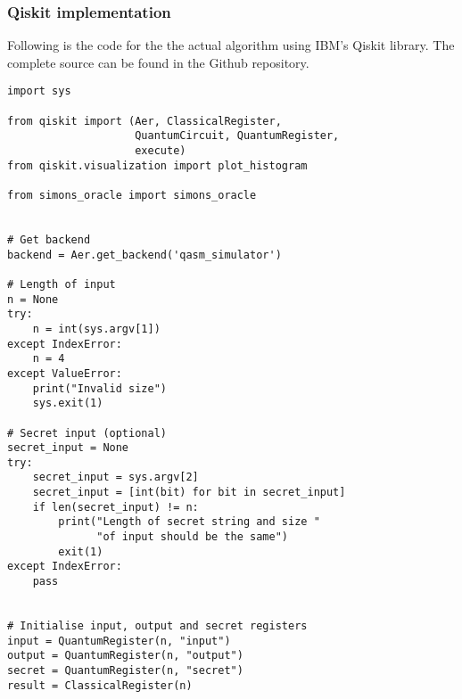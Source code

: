 \documentclass[13pt]{article}
\begin{document}
\subsubsection*{Qiskit implementation}
Following is the code for the the actual algorithm using IBM's Qiskit library. The complete source can be found in the Github repository.
\begin{tcolorbox}[
    enhanced,
    attach boxed title to top left={xshift=6mm,yshift=-3mm},
    title=Simon's Algorithm Code,
    boxed title style={size=small,sharp corners},
    sharp corners,
]
\begin{verbatim}
import sys

from qiskit import (Aer, ClassicalRegister,
                    QuantumCircuit, QuantumRegister,
                    execute)
from qiskit.visualization import plot_histogram

from simons_oracle import simons_oracle


# Get backend
backend = Aer.get_backend('qasm_simulator')

# Length of input
n = None
try:
    n = int(sys.argv[1])
except IndexError:
    n = 4
except ValueError:
    print("Invalid size")
    sys.exit(1)

# Secret input (optional)
secret_input = None
try:
    secret_input = sys.argv[2]
    secret_input = [int(bit) for bit in secret_input]
    if len(secret_input) != n:
        print("Length of secret string and size "
              "of input should be the same")
        exit(1)
except IndexError:
    pass


# Initialise input, output and secret registers
input = QuantumRegister(n, "input")
output = QuantumRegister(n, "output")
secret = QuantumRegister(n, "secret")
result = ClassicalRegister(n)
\end{verbatim}
\end{tcolorbox}
\end{document}
